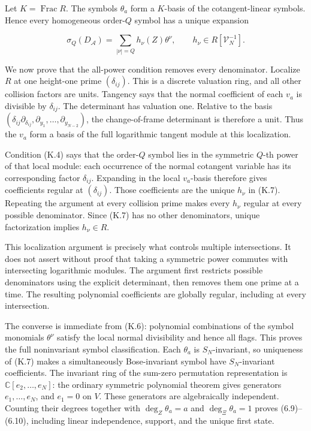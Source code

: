 \documentclass[a4paper,11pt]{article}
\numberwithin{equation}{section}
\begin{document}
Let \(K=\operatorname{Frac}R\). The symbols \(\theta_a\) form a \(K\)-basis of the cotangent-linear symbols. Hence every homogeneous order-\(Q\) symbol has a unique expansion

\[
\sigma_Q(D_{\mathcal A})=\sum_{|\nu|=Q}h_\nu(Z)\theta^\nu,
\qquad h_\nu\in R[\mathcal V_N^{-1}].
\tag{K.7}
\]

We now prove that the all-power condition removes every denominator. Localize \(R\) at one height-one prime \((\delta_{ij})\). This is a discrete valuation ring, and all other collision factors are units. Tangency says that the normal coefficient of each \(v_a\) is divisible by \(\delta_{ij}\). The determinant has valuation one. Relative to the basis \((\delta_{ij}\partial_{\delta_{ij}},\partial_{y_1},\ldots,\partial_{y_{N-2}})\), the change-of-frame determinant is therefore a unit. Thus the \(v_a\) form a basis of the full logarithmic tangent module at this localization.

Condition (K.4) says that the order-\(Q\) symbol lies in the symmetric \(Q\)-th power of that local module: each occurrence of the normal cotangent variable has its corresponding factor \(\delta_{ij}\). Expanding in the local \(v_a\)-basis therefore gives coefficients regular at \((\delta_{ij})\). Those coefficients are the unique \(h_\nu\) in (K.7). Repeating the argument at every collision prime makes every \(h_\nu\) regular at every possible denominator. Since (K.7) has no other denominators, unique factorization implies \(h_\nu\in R\).

This localization argument is precisely what controls multiple intersections. It does not assert without proof that taking a symmetric power commutes with intersecting logarithmic modules. The argument first restricts possible denominators using the explicit determinant, then removes them one prime at a time. The resulting polynomial coefficients are globally regular, including at every intersection.

The converse is immediate from (K.6): polynomial combinations of the symbol monomials \(\theta^\nu\) satisfy the local normal divisibility and hence all flags. This proves the full noninvariant symbol classification. Each \(\theta_a\) is \(S_N\)-invariant, so uniqueness of (K.7) makes a simultaneously Bose-invariant symbol have \(S_N\)-invariant coefficients. The invariant ring of the sum-zero permutation representation is \(\mathbb C[e_2,\ldots,e_N]\): the ordinary symmetric polynomial theorem gives generators \(e_1,\ldots,e_N\), and \(e_1=0\) on \(V\). These generators are algebraically independent. Counting their degrees together with \(\deg_Z\theta_a=a\) and \(\deg_\Xi\theta_a=1\) proves (6.9)--(6.10), including linear independence, support, and the unique first state.
\end{document}
